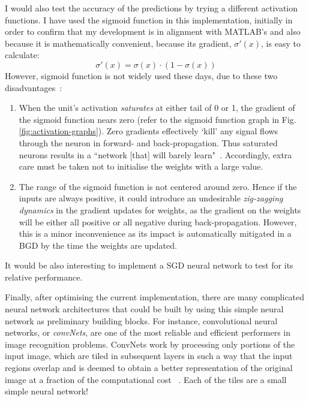I would also test the accuracy of the predictions by trying a different activation functions. I have used the sigmoid function in this implementation, initially in order to confirm that my development is in alignment with MATLAB's and also because it is mathematically convenient, because its gradient, $\sigma'(x)$, is easy to calculate:
$$\sigma'(x) = \sigma(x) \cdot (1 - \sigma(x))$$
However, sigmoid function is not widely used these days, due to these two disadvantages~\cite{Kar16}:
\begin{enumerate}
\item When the unit's activation \textit{saturates} at either tail of 0 or 1, the gradient of the sigmoid function nears zero (refer to the sigmoid function graph in Fig. \ref{fig:activation-graphs}). Zero gradients effectively `kill' any signal flows through the neuron in forward- and back-propagation. Thus saturated neurons results in a ``network [that] will barely learn"~\cite{Kar16}. Accordingly, extra care must be taken not to initialise the weights with a large value.
\item The range of the sigmoid function is not centered around zero. Hence if the inputs are always positive, it could introduce an undesirable \textit{zig-zagging dynamics} in the gradient updates for weights, as the gradient on the weights will be either all positive or all negative during back-propagation. However, this is a minor inconvenience as its impact is automatically mitigated in a BGD by the time the weights are updated.
\end{enumerate}

It would be also interesting to implement a SGD neural network to test for its relative performance.

Finally, after optimising the current implementation, there are many complicated neural network architectures that could be built by using this simple neural network as preliminary building blocks. For instance, convolutional neural networks, or \textit{convNets}, are one of the most reliable and efficient performers in image recognition problems. ConvNets work by processing only portions of the input image, which are tiled in subsequent layers in such a way that the input regions overlap and is deemed to obtain a better representation of the original image at a fraction of the computational cost ~\cite{BC16}. Each of the tiles are a small simple neural network!